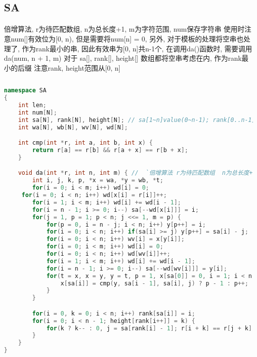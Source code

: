 ﻿\subsection{SA}
\paragraph{}
倍增算法, r为待匹配数组, n为总长度+1, m为字符范围, num保存字符串
使用时注意num[]有效位为[0, n), 但是需要将num[n] = 0, 另外, 对于模板的处理将空串也处理了, 作为rank最小的串, 因此有效串为[0, n]共n-1个, 在调用da()函数时, 需要调用da(num, n + 1, m) 对于 sa[], rank[], height[] 数组都将空串考虑在内, 作为rank最小的后缀
注意rank, height范围从[0, n]
\begin{lstlisting}[language=C++]
	
namespace SA
{
    int len;
    int num[N];
    int sa[N], rank[N], height[N]; // sa[1~n]value(0~n-1); rank[0..n-1]value(1..n); height[2..n]
    int wa[N], wb[N], wv[N], wd[N];

    int cmp(int *r, int a, int b, int x) {
        return r[a] == r[b] && r[a + x] == r[b + x];
    }

    void da(int *r, int n, int m) { //  `倍增算法 r为待匹配数组  n为总长度+1 m为字符范围`
        int i, j, k, p, *x = wa, *y = wb, *t;
        for(i = 0; i < m; i++) wd[i] = 0;
     for(i = 0; i < n; i++) wd[x[i] = r[i]]++;
        for(i = 1; i < m; i++) wd[i] += wd[i - 1];
        for(i = n - 1; i >= 0; i--) sa[--wd[x[i]]] = i;
        for(j = 1, p = 1; p < n; j <<= 1, m = p) {
            for(p = 0, i = n - j; i < n; i++) y[p++] = i;
            for(i = 0; i < n; i++) if(sa[i] >= j) y[p++] = sa[i] - j;
            for(i = 0; i < n; i++) wv[i] = x[y[i]];
            for(i = 0; i < m; i++) wd[i] = 0;
            for(i = 0; i < n; i++) wd[wv[i]]++;
            for(i = 1; i < m; i++) wd[i] += wd[i - 1];
            for(i = n - 1; i >= 0; i--) sa[--wd[wv[i]]] = y[i];
            for(t = x, x = y, y = t, p = 1, x[sa[0]] = 0, i = 1; i < n; i++) {
                x[sa[i]] = cmp(y, sa[i - 1], sa[i], j) ? p - 1 : p++;
            }
        }

        for(i = 0, k = 0; i < n; i++) rank[sa[i]] = i;
        for(i = 0; i < n - 1; height[rank[i++]] = k) {
            for(k ? k-- : 0, j = sa[rank[i] - 1]; r[i + k] == r[j + k]; k++);
        }
    }
}
	\end{lstlisting}